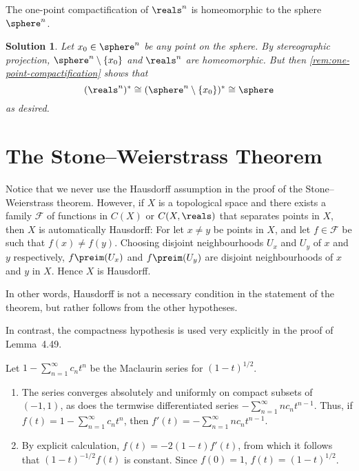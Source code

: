 \documentclass[article, a4paper, 11pt, oneside]{memoir}
\numberwithin{equation}{chapter}
\newcommand{\calF}{\mathcal{F}}
\theoremstyle{nonumberplain}
\newtheorem{solution}{Solution}
\begin{document}
\begin{exerciseframed}[52]
	The one-point compactification of $\reals^n$ is homeomorphic to the sphere $\sphere^n$.
\end{exerciseframed}

\begin{solution}
	Let $x_0 \in \sphere^n$ be any point on the sphere. By stereographic projection, $\sphere^n \setminus \{x_0\}$ and $\reals^n$ are homeomorphic. But then \cref{rem:one-point-compactification} shows that
	\begin{equation*}
		(\reals^n)^*
			\cong (\sphere^n \setminus \{x_0\})^*
			\cong \sphere
	\end{equation*}
	as desired.
\end{solution}


\addtocounter{section}{1}
\section{The Stone--Weierstrass Theorem}

\begin{remark}
	Notice that we never use the Hausdorff assumption in the proof of the Stone--Weierstrass theorem. However, if $X$ is a topological space and there exists a family $\calF$ of functions in $C(X)$ or $C(X,\reals)$ that separates points in $X$, then $X$ is automatically Hausdorff: For let $x \neq y$ be points in $X$, and let $f \in \calF$ be such that $f(x) \neq f(y)$. Choosing disjoint neighbourhoods $U_x$ and $U_y$ of $x$ and $y$ respectively, $f\preim(U_x)$ and $f\preim(U_y)$ are disjoint neighbourhoods of $x$ and $y$ in $X$. Hence $X$ is Hausdorff.

	In other words, Hausdorff is not a necessary condition in the statement of the theorem, but rather follows from the other hypotheses.

	In contrast, the compactness hypothesis is used very explicitly in the proof of Lemma~4.49.
\end{remark}

\begin{exerciseframed*}[66]
	Let $1 - \sum_{n=1}^\infty c_n t^n$ be the Maclaurin series for $(1 - t)^{1/2}$.
	\begin{enumerate}
		\item The series converges absolutely and uniformly on compact subsets of $(-1,1)$, as does the termwise differentiated series $- \sum_{n=1}^\infty n c_n t^{n-1}$. Thus, if $f(t) = 1 - \sum_{n=1}^\infty c_n t^n$, then $f'(t) = - \sum_{n=1}^\infty n c_n t^{n-1}$.

		\item By explicit calculation, $f(t) = -2(1-t) f'(t)$, from which it follows that $(1-t)^{-1/2} f(t)$ is constant. Since $f(0) = 1$, $f(t) = (1-t)^{1/2}$.
	\end{enumerate}
\end{exerciseframed*}
\end{document}

